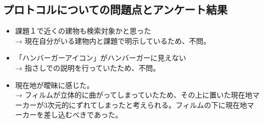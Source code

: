 \documentclass[12pt,a4paper,dvipdf]{jsarticle}
\begin{document}
\subsection{プロトコルについての問題点とアンケート結果}
\begin{itemize}
      \item 課題１で近くの建物も検索対象かと思った\\
            → 現在自分がいる建物内と課題で明示しているため、不問。
      \item 「ハンバーガーアイコン」がハンバーガーに見えない\\
            → 指さしでの説明を行っていたため、不問。
      \item 現在地が曖昧に感じた。\\
            → フィルムが立体的に曲がってしまっていたため、その上に置いた現在地マーカーが3次元的にずれてしまったと考えられる。フィルムの下に現在地マーカーを差し込むべきであった。
\end{itemize}
\end{document}
